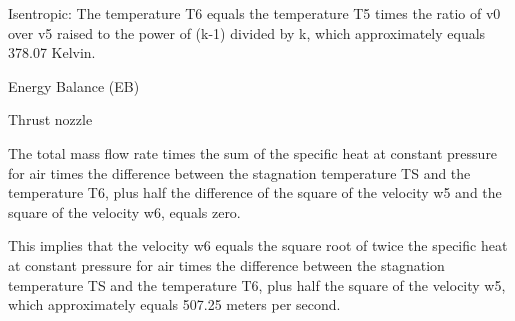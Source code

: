 Isentropic: The temperature T6 equals the temperature T5 times the ratio of v0 over v5 raised to the power of (k-1) divided by k, which approximately equals 378.07 Kelvin.

Energy Balance (EB)

Thrust nozzle

The total mass flow rate times the sum of the specific heat at constant pressure for air times the difference between the stagnation temperature TS and the temperature T6, plus half the difference of the square of the velocity w5 and the square of the velocity w6, equals zero.

This implies that the velocity w6 equals the square root of twice the specific heat at constant pressure for air times the difference between the stagnation temperature TS and the temperature T6, plus half the square of the velocity w5, which approximately equals 507.25 meters per second.